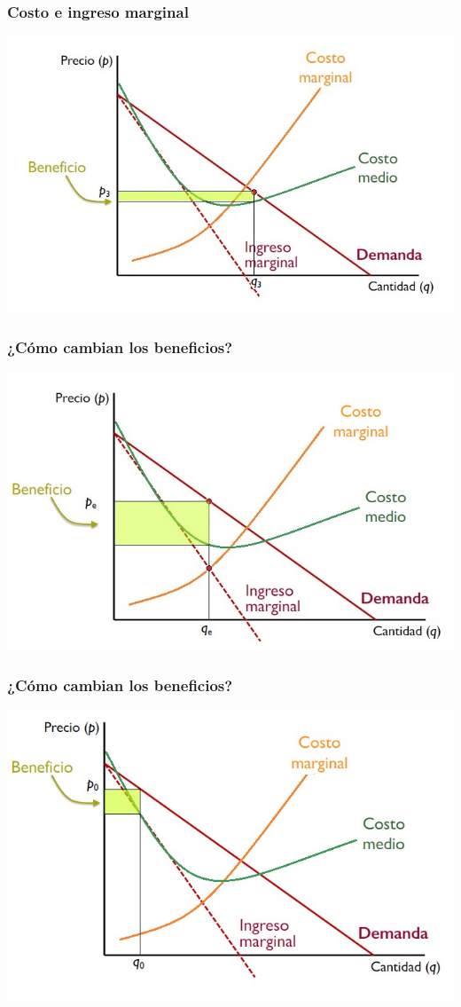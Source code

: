 \documentclass{beamer}
\begin{document}
\begin{frame}
\frametitle{Costo e ingreso marginal}
\includegraphics[scale=0.6]{../Figures/Tema_06.36_beneficios3.jpg}
\end{frame}

\begin{frame}
\frametitle{¿Cómo cambian los beneficios?}
\includegraphics[scale=0.6]{../Figures/Tema_06.35_beneficios2.jpg}
\end{frame}

\begin{frame}
\frametitle{¿Cómo cambian los beneficios?}
\includegraphics[scale=0.6]{../Figures/Tema_06.34_beneficios.jpg}
\end{frame}
\end{document}
